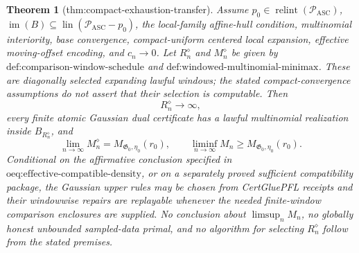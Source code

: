 \documentclass{article}
\newtheorem{theorem}{Theorem}
\begin{document}
\begin{theorem}[thm:compact-exhaustion-transfer]\label{thm:compact-exhaustion-transfer}
Assume \(p_0\in\operatorname{relint}(\mathcal P_{\mathrm{ASC}})\), \(\operatorname{im}(B)\subseteq\operatorname{lin}(\mathcal P_{\mathrm{ASC}}-p_0)\), the local-family affine-hull condition, multinomial interiority, base convergence, compact-uniform centered local expansion, effective moving-offset encoding, and \(c_n\to0\).  Let \(R_n^{\diamond}\) and \(M_n^{\diamond}\) be given by \(\text{def:comparison-window-schedule}\) and \(\text{def:windowed-multinomial-minimax}\).  These are diagonally selected expanding lawful windows; the stated compact-convergence assumptions do not assert that their selection is computable.  Then
\[
R_n^{\diamond}\to\infty,
\]
every finite atomic Gaussian dual certificate has a lawful multinomial realization inside \(B_{R_n^{\diamond}}\), and
\[
\lim_{n\to\infty}M_n^{\diamond}
=M_{\mathfrak G_0,\eta_0}(r_0),
\qquad
\liminf_{n\to\infty}M_n
\ge M_{\mathfrak G_0,\eta_0}(r_0).
\]
Conditional on the affirmative conclusion specified in \(\text{oeq:effective-compatible-density}\), or on a separately proved sufficient compatibility package, the Gaussian upper rules may be chosen from CertGluePFL receipts and their windowwise repairs are replayable whenever the needed finite-window comparison enclosures are supplied.  No conclusion about \(\limsup_nM_n\), no globally honest unbounded sampled-data primal, and no algorithm for selecting \(R_n^{\diamond}\) follow from the stated premises.
\end{theorem}
\end{document}
